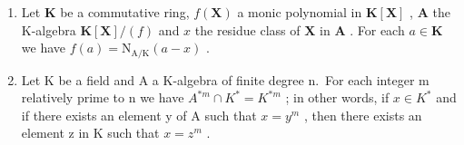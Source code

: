 \BourbakiExerciseGroup

\begin{enumerate}
\def\labelenumi{\arabic{enumi})}
\item
  Let \(\mathbf{K}\) be a commutative ring, \(f(\mathbf{X})\) a monic polynomial in \(\mathbf{K}[\mathbf{X}]\) , \(\mathbf{A}\) the K-algebra \(\mathbf{K}[\mathbf{X}] / (f)\) and \(x\) the residue class of \(\mathbf{X}\) in \(\mathbf{A}\) . For each \(a \in \mathbf{K}\) we have \(f(a) = \mathrm{N}_{\mathrm{A} / \mathrm{K}}(a - x)\) .
\item
  Let K be a field and A a K-algebra of finite degree n.~For each integer m relatively prime to n we have \(A^{*m} \cap K^{*} = K^{*m}\) ; in other words, if \(x \in K^{*}\) and if there exists an element y of A such that \(x = y^{m}\) , then there exists an element z in K such that \(x = z^{m}\) .
\end{enumerate}

